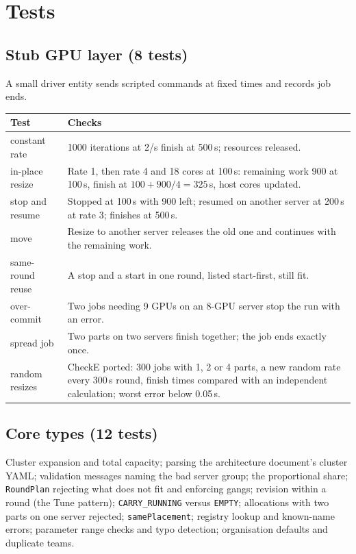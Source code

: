 \documentclass[11pt,a4paper]{article}
\newcommand{\code}[1]{\texttt{#1}}
\begin{document}
\section{Tests}

\subsection{Stub GPU layer (8 tests)}
A small driver entity sends scripted commands at fixed times and records job ends.

\begin{center}
\begin{tabularx}{\linewidth}{@{}lX@{}}
\toprule
Test & Checks \\
\midrule
constant rate & 1000 iterations at 2/s finish at 500\,s; resources released. \\
in-place resize & Rate 1, then rate 4 and 18 cores at 100\,s: remaining work 900 at 100\,s,
  finish at $100 + 900/4 = 325$\,s, host cores updated. \\
stop and resume & Stopped at 100\,s with 900 left; resumed on another server at 200\,s at
  rate 3; finishes at 500\,s. \\
move & Resize to another server releases the old one and continues with the remaining work. \\
same-round reuse & A stop and a start in one round, listed start-first, still fit. \\
over-commit & Two jobs needing 9 GPUs on an 8-GPU server stop the run with an error. \\
spread job & Two parts on two servers finish together; the job ends exactly once. \\
random resizes & CheckE ported: 300 jobs with 1, 2 or 4 parts, a new random rate every 300\,s
  round, finish times compared with an independent calculation; worst error below 0.05\,s. \\
\bottomrule
\end{tabularx}
\end{center}

\subsection{Core types (12 tests)}
Cluster expansion and total capacity; parsing the architecture document's cluster YAML; validation
messages naming the bad server group; the proportional share; \code{RoundPlan} rejecting what does
not fit and enforcing gangs; revision within a round (the Tune pattern); \code{CARRY\_RUNNING}
versus \code{EMPTY}; allocations with two parts on one server rejected; \code{samePlacement};
registry lookup and known-name errors; parameter range checks and typo detection; organisation
defaults and duplicate teams.
\end{document}
